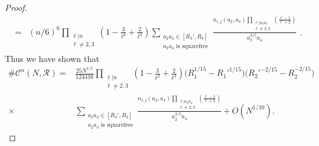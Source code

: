 \documentclass[10pt,a4paper]{amsart}
\begin{document}
\begin{proof}
\[\begin{split}
    =& (n/6)^6\prod_{\substack{\ell|n\\\ell\neq 2,3}}\left(1-\frac{3}{\ell^2}+\frac{2}{\ell^3}\right)\sum_{\substack{a_2a_4\in [R_3', R_3]\\
    a_2a_4\text{ is squarefree}}}\frac{n_{i,j} (a_2,a_4)\prod_{\substack{\ell|a_2a_4\\\ell\neq 2,3}}\left(\frac{\ell-1}{\ell+2}\right)}{a_2^{3/5} a_4}
\end{split}.\]
Thus we have shown that 
\[\begin{split}\#\mathcal{C}^n(N,\mathscr{R})=&\frac{25 N^{1/5}}{124416}\prod_{\substack{\ell|n\\\ell\neq 2,3}}\left(1-\frac{3}{\ell^2}+\frac{2}{\ell^3}\right)
\bigl(R_1^{1/15}-R_1'^{1/15}\bigr)
\bigl(R_2'^{-2/15}-R_2^{-2/15}\bigr) \\
\times& \sum_{\substack{a_2a_4\in [R_3', R_3]\\
    a_2a_4\text{ is squarefree}}}\frac{n_{i,j}(a_2,a_4)\prod_{\substack{\ell|a_2a_4\\ \ell\neq 2,3}}\left(\frac{\ell-1}{\ell+2}\right)}{a_2^{3/5} a_4}+
O\!\left(N^{1/10}\right).\end{split}\]
\end{proof}
\end{document}
